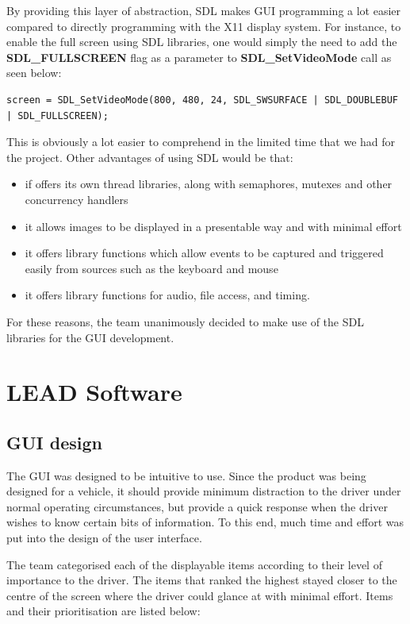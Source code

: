 \documentclass[11pt]{report} %
\begin{document}
By providing this layer of abstraction, SDL makes GUI programming a lot easier compared to directly 
programming with the X11 display system. For instance, to enable the full screen using SDL libraries, one would 
simply the need to add the {\bf SDL\_FULLSCREEN} flag as a parameter to {\bf SDL\_SetVideoMode} call as seen below:

\begin{lstlisting}
screen = SDL_SetVideoMode(800, 480, 24, SDL_SWSURFACE | SDL_DOUBLEBUF | SDL_FULLSCREEN);
\end{lstlisting}

This is obviously a lot easier to comprehend in the limited time that we had for the project.
Other advantages of using SDL would be that:
	\begin{itemize}
		\item if offers its own thread libraries, along with semaphores, mutexes and other concurrency handlers
		\item it allows images to be displayed in a presentable way and with minimal effort
		\item it offers library functions which allow events to be captured and triggered easily from sources such as the keyboard and mouse
		\item it offers library functions for  audio, file access, and  timing.
	\end{itemize}


For these reasons, the team unanimously decided to make use of the SDL libraries for the GUI development.		
				
	\section{LEAD Software}

	\subsection{GUI design}
	The GUI was designed to be intuitive to use. Since the product was being designed
	for a vehicle, it should provide minimum distraction to the driver under normal operating
	circumstances, but provide a quick response when the driver wishes to know certain bits 
	of information. To this end, much time and effort was put into the design of the user interface.

	The team categorised each of the displayable items according to their level of 
	importance to the driver. The items that ranked the highest stayed closer to 
	the centre of the screen where the driver could glance at with minimal effort. 
	Items and their prioritisation are listed below:
\end{document}
